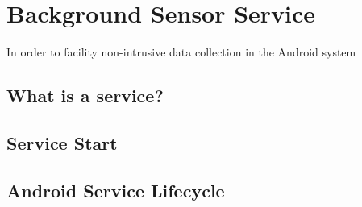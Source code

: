 
\section{Background Sensor Service}
\label{sec:background_sensor_service}

In order to facility non-intrusive data collection in the Android system 

\subsection{What is a service?}

\subsection{Service Start}

\subsection{Android Service Lifecycle}

